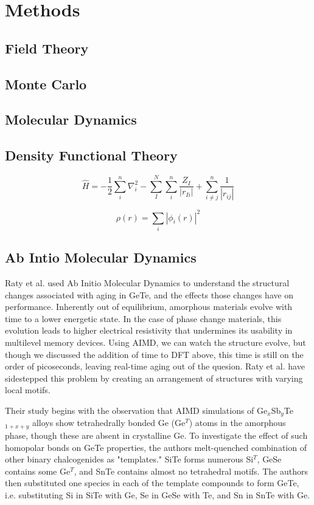 \documentclass[3p,review,12pt]{elsarticle}
\begin{document}
\section{Methods}


\subsection{Field Theory}

\subsection{Monte Carlo}

\subsection{Molecular Dynamics}

\subsection{Density Functional Theory}
\begin{equation}
\hat{H}=-\frac{1}{2}\sum_{i}^{n}\nabla_{i}^{2}-\sum_{I}^{N}\sum_{i}^{n}\frac{Z_{I}}{|r_{Ii}|}+\sum_{i\neq j}^{n}\frac{1}{|r_{ij}|}
\end{equation}

\begin{equation}
\rho (r) = \sum_{i}|\phi _{i}(r)|^{2}
\end{equation}


\subsection{Ab Intio Molecular Dynamics}
Raty et al. \cite{Raty2015} used Ab Initio Molecular Dynamics to understand the structural changes associated with aging in GeTe, and the effects those changes have on performance. Inherently out of equilibrium, amorphous materials evolve with time to a lower energetic state. In the case of phase change materials, this evolution leads to higher electrical resistivity that undermines its usability in multilevel memory devices. Using AIMD, we can watch the structure evolve, but though we discussed the addition of time to DFT above, this time is still on the order of picoseconds, leaving real-time aging out of the quesion. Raty et al. have sidestepped this problem by creating an arrangement of structures with varying local motifs. 
\par
Their study begins with the observation that AIMD simulations of Ge$_{x}$Sb$_{y}$Te$_{1+x+y}$ alloys show tetrahedrally bonded Ge (Ge$^{T}$) atoms in the amorphous phase, though these are absent in crystalline Ge. To investigate the effect of such homopolar bonds on GeTe properties, the authors melt-quenched combination of other binary chalcogenides as "templates." SiTe forms numerous Si$^{T}$, GeSe contains some Ge$^{T}$, and SnTe contains almost no tetrahedral motifs.  The authors then substituted one species in each of the template compounds to form GeTe, i.e. substituting Si in SiTe with Ge, Se in GeSe with Te, and Sn in SnTe with Ge.
\end{document}
